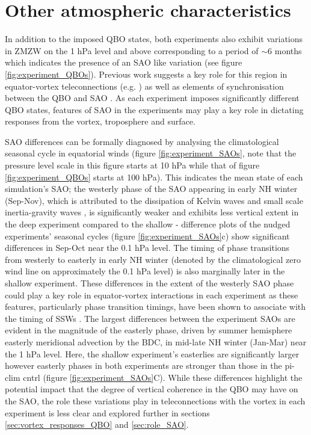 \section{Other atmospheric characteristics}

In addition to the imposed QBO states, both experiments also exhibit variations in ZMZW on the 1 hPa level and above corresponding to a period of $\sim$6 months which indicates the presence of an SAO like variation (see figure \ref{fig:experiment_QBOs}). Previous work suggests a key role for this region in equator-vortex teleconnections (e.g. \cite{grayForecasting2020a}) as well as elements of synchronisation between the QBO and SAO \citep{kuaiNonstationary2009c}. As each experiment imposes significantly different QBO states, features of SAO in the experiments may play a key role in dictating responses from the vortex, troposphere and surface.

SAO differences can be formally diagnosed by analysing the climatological seasonal cycle in equatorial winds (figure \ref{fig:experiment_SAOs}, note that the pressure level scale in this figure starts at 10 hPa while that of figure \ref{fig:experiment_QBOs} starts at 100 hPa). This indicates the mean state of each simulation's SAO; the westerly phase of the SAO appearing in early NH winter (Sep-Nov), which is attributed to the dissipation of Kelvin waves and small scale inertia-gravity waves \citep{dunkertonRole1979, hitchmanEstimation1988}, is significantly weaker and exhibits less vertical extent in the deep experiment compared to the shallow - difference plots of the nudged experiments' seasonal cycles (figure \ref{fig:experiment_SAOs}c) show significant differences in Sep-Oct near the 0.1 hPa level. The timing of phase transitions from westerly to easterly in early NH winter (denoted by the climatological zero wind line on approximately the 0.1 hPa level) is also marginally later in the shallow experiment. These differences in the extent of the westerly SAO phase could play a key role in equator-vortex interactions in each experiment as these features, particularly phase transition timings, have been shown to associate with the timing of SSWs \citep{grayData2001, hamiltonEffects1998}. The largest differences between the experiment SAOs are evident in the magnitude of the easterly phase, driven by summer hemisphere easterly meridional advection by the BDC, in mid-late NH winter (Jan-Mar) near the 1 hPa level. Here, the shallow experiment's easterlies are significantly larger however easterly phases in both experiments are stronger than those in the pi-clim cntrl (figure \ref{fig:experiment_SAOs}C). While these differences highlight the potential impact that the degree of vertical coherence in the QBO may have on the SAO, the role these variations play in teleconnections with the vortex in each experiment is less clear and explored further in sections \ref{sec:vortex_responses_QBO} and \ref{sec:role_SAO}.

